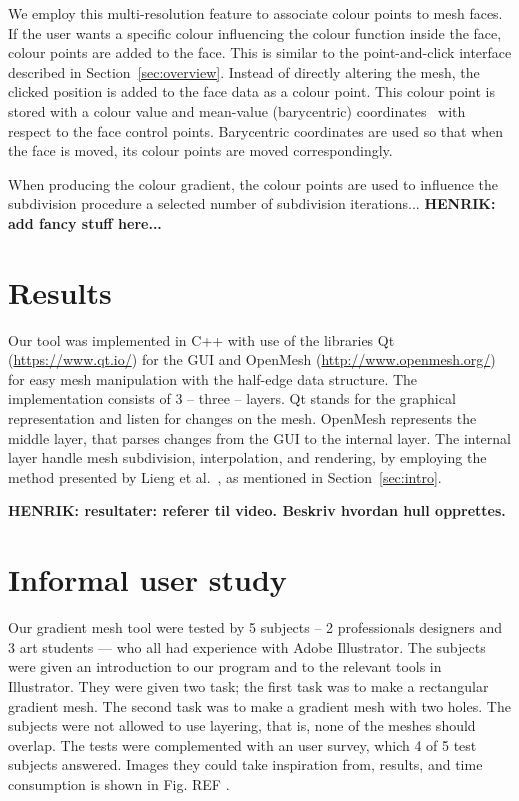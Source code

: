 \documentclass{egpubl}
\newcommand{\note}[3]{{\color{#2}\textbf{#1: #3}}}
\newcommand{\henrik}[1]{\note{HENRIK}{WildStrawberry}{#1}}
\begin{document}
We employ this multi-resolution feature to associate colour points to mesh faces. If the user wants a specific colour influencing the colour function inside the face, colour points are added to the face. This is similar to the point-and-click interface described in Section~\ref{sec:overview}. Instead of directly altering the mesh, the clicked position is added to the face data as a colour point. This colour point is stored with a colour value and mean-value (barycentric) coordinates~\cite{Floater:2003} with respect to the face control points. Barycentric coordinates are used so that when the face is moved, its colour points are moved correspondingly.

When producing the colour gradient, the colour points are used to influence the subdivision procedure a selected number of subdivision iterations... \henrik{add fancy stuff here...}

\section{Results}
\label{sec:results}

Our tool was implemented in C++ with use of the libraries Qt (\url{https://www.qt.io/}) for the GUI and OpenMesh (\url{http://www.openmesh.org/}) for easy mesh manipulation with the half-edge data structure. The implementation consists of 3 -- three -- layers. Qt stands for the graphical representation and listen for changes on the mesh. OpenMesh represents the middle layer, that parses changes from the GUI to the internal layer. The internal layer handle mesh subdivision, interpolation, and rendering, by employing the method presented by Lieng et al.~\cite{Lieng:2016}, as mentioned in Section~\ref{sec:intro}.





\henrik{resultater: referer til video. Beskriv hvordan hull opprettes.}

\section{Informal user study}
\label{sec:evaluation}

Our gradient mesh tool were tested by 5 subjects -- 2 professionals designers and 3 art students --- who all had experience with Adobe Illustrator. The subjects were given an introduction to our program and to the relevant tools in Illustrator. They were given two task; the first task was to make a rectangular gradient mesh. The second task was to make a gradient mesh with two holes. The subjects were not allowed to use layering, that is, none of the meshes should overlap. The tests were complemented with an user survey, which 4 of 5 test subjects answered. Images they could take inspiration from, results, and time consumption is shown in Fig. REF . 
\end{document}
